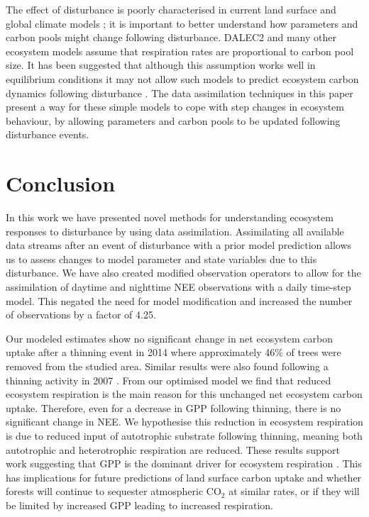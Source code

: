 \documentclass[draft,linenumbers]{agujournal}
\begin{document}
The effect of disturbance is poorly characterised in current land surface and global climate models \citep{running2008ecosystem}; it is important to better understand how parameters and carbon pools might change following disturbance. DALEC2 and many other ecosystem models assume that respiration rates are proportional to carbon pool size. It has been suggested that although this assumption works well in equilibrium conditions it may not allow such models to predict ecosystem carbon dynamics following disturbance \citep{schimel2003implications}. The data assimilation techniques in this paper present a way for these simple models to cope with step changes in ecosystem behaviour, by allowing parameters and carbon pools to be updated following disturbance events. 



\section{Conclusion}

In this work we have presented novel methods for understanding ecosystem responses to disturbance by using data assimilation. Assimilating all available data streams after an event of disturbance with a prior model prediction allows us to assess changes to model parameter and state variables due to this disturbance. We have also created modified observation operators to allow for the assimilation of daytime and nighttime NEE observations with a daily time-step model. This negated the need for model modification and increased the number of observations by a factor of 4.25.

Our {\color{blue}modeled} estimates show no significant change in net ecosystem carbon uptake after a thinning event in 2014 where approximately 46\% of trees were removed from the studied area. Similar results were also found following a thinning activity in 2007 \citep{wilkinson2016}. From our optimised model we find that reduced ecosystem respiration is the main reason for this unchanged net ecosystem carbon uptake. Therefore, even for a decrease in GPP following thinning, there is no significant change in NEE. We hypothesise this reduction in ecosystem respiration is due to reduced input of autotrophic substrate following thinning, meaning both autotrophic and heterotrophic respiration are reduced. These results support work suggesting that GPP is the dominant driver for ecosystem respiration  \citep{GCB:GCB412, PCE:PCE1053, hogberg2006towards, heinemeyer2012exploring, ELE:ELE12097}. This has implications for future predictions of land surface carbon uptake and whether forests will continue to sequester atmospheric CO\(_{2}\) at similar rates, or if they will be limited by increased GPP leading to increased respiration. 
\end{document}
